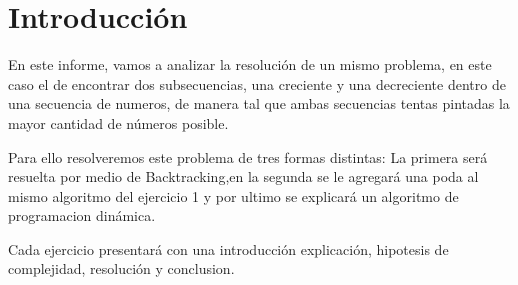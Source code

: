 \section{Introducción}

En este informe, vamos a analizar la resolución de un mismo problema, en este caso el de encontrar dos subsecuencias, una creciente y una decreciente dentro de una secuencia de numeros, de manera tal
que ambas secuencias tentas pintadas la mayor cantidad de números posible.

Para ello resolveremos este problema de tres formas distintas:
La primera será resuelta por medio de Backtracking,en la segunda se le agregará una poda al mismo algoritmo del ejercicio 1 y por ultimo se explicará un algoritmo de programacion dinámica.

Cada ejercicio presentará con una introducción explicación, hipotesis de complejidad, resolución y conclusion.
